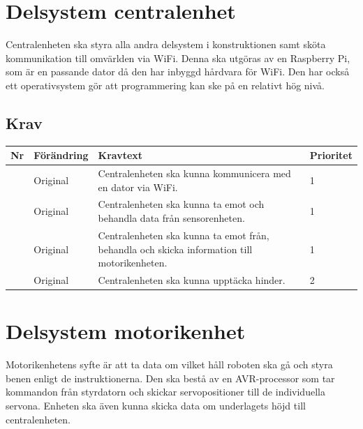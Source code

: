 \documentclass[a4paper,titlepage,12pt]{article}
\newcounter{reqNr}
\newcommand{\nextReqNr}{\stepcounter{reqNr}\arabic{reqNr}}
\begin{document}
	\section{Delsystem centralenhet}
	Centralenheten ska styra alla andra delsystem i konstruktionen samt sköta
	kommunikation till omvärlden via WiFi. Denna ska utgöras av en Raspberry
	Pi, som är en passande dator då den har inbyggd hårdvara för WiFi. Den har 
	också ett operativsystem gör att programmering kan ske på en relativt hög nivå.

	\newpage

	\subsection{Krav}
	\begin{table}[h]
		\label{tab:label}
		\begin{tabularx}{\textwidth}{|c|l|X|l|}
			\hline
			\textbf{Nr} & \textbf{Förändring} & \textbf{Kravtext} & \textbf{Prioritet} 
				\\ \hline

			\nextReqNr & Original & Centralenheten ska kunna kommunicera 
				med en dator via WiFi. & 1
				\\ \hline

			\nextReqNr & Original & Centralenheten ska kunna ta emot och 
				behandla data från sensorenheten.& 1
				\\ \hline

			\nextReqNr & Original & Centralenheten ska kunna ta emot från, 
				behandla och skicka information till motorikenheten. & 1
				\\ \hline

			\nextReqNr & Original & Centralenheten ska kunna upptäcka hinder. & 2
			\\ \hline

		\end{tabularx}
	\end{table}




	\section{Delsystem motorikenhet}
	Motorikenhetens syfte är att ta data om vilket håll roboten ska gå och styra benen enligt de
	instruktionerna. Den ska bestå av en AVR-processor som tar kommandon från styrdatorn och skickar
	servopositioner till de individuella servona. Enheten ska även kunna skicka data om underlagets
	höjd till centralenheten.
\end{document}
